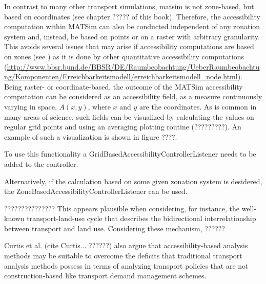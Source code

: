 In contrast to many other transport simulations, \gls{matsim} is not zone-based, but based on coordinates (see 
chapter ????? of this book). Therefore, the accessibility computation within MATSim can also be conducted independent 
of any zonation system and, instead, be based on points or on a raster with arbitrary granularity. This avoids 
several issues that may arise if accessibility computations are based on zones 
(see \citep[e.g.,][]{NicolaiNagel2012HiResAccessibilityMethodInBook}) as it is done by other quantitative 
accessibility computations 
%
%
(\url{http://www.bbsr.bund.de/BBSR/DE/Raumbeobachtung/UeberRaumbeobachtung/Komponenten/Erreichbarkeitsmodell/erreichbarkeitsmodell_node.html}). Being raster- or coordinate-based, the outcome of the MATSim accessibility computation can be considered as 
an accessibility field,
\ie as a measure continuously varying in space, $A(x,y)$, where $x$ and $y$
are the coordinates. As is common in many areas of science, such
fields can be visualized by calculating the values on regular grid
points and using an averaging plotting routine (?????????). An example of such a visualization is shown in figure ????.

To use this functionality a GridBasedAccessibilityControllerListener needs to be added to the controller.

Alternatively, if the calculation based on some given zonation system is desidered, the ZoneBasedAccessibilityControllerListener can be used.





???????????????
This appears plausible when considering, for instance, the well-known transport-land-use cycle that describes the 
bidirectional interrelationship between transport and land use. Considering these mechanism, ?????? 

Curtis et al. (cite Curtis... ??????) also argue that accessibility-based analysis methods may be suitable to overcome 
the deficits that traditional transport analysis methods possess in terms of analyzing transport policies that are not 
construction-based like transport demand management schemes.

